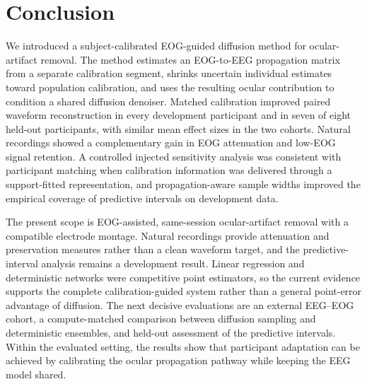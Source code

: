 \section{Conclusion}
\label{sec:conclusion}

We introduced a subject-calibrated EOG-guided diffusion method for ocular-artifact removal. The method estimates an EOG-to-EEG propagation matrix from a separate calibration segment, shrinks uncertain individual estimates toward population calibration, and uses the resulting ocular contribution to condition a shared diffusion denoiser. Matched calibration improved paired waveform reconstruction in every development participant and in seven of eight held-out participants, with similar mean effect sizes in the two cohorts. Natural recordings showed a complementary gain in EOG attenuation and low-EOG signal retention. A controlled injected sensitivity analysis was consistent with participant matching when calibration information was delivered through a support-fitted representation, and propagation-aware sample widths improved the empirical coverage of predictive intervals on development data.

The present scope is EOG-assisted, same-session ocular-artifact removal with a compatible electrode montage. Natural recordings provide attenuation and preservation measures rather than a clean waveform target, and the predictive-interval analysis remains a development result. Linear regression and deterministic networks were competitive point estimators, so the current evidence supports the complete calibration-guided system rather than a general point-error advantage of diffusion. The next decisive evaluations are an external EEG--EOG cohort, a compute-matched comparison between diffusion sampling and deterministic ensembles, and held-out assessment of the predictive intervals. Within the evaluated setting, the results show that participant adaptation can be achieved by calibrating the ocular propagation pathway while keeping the EEG model shared.
